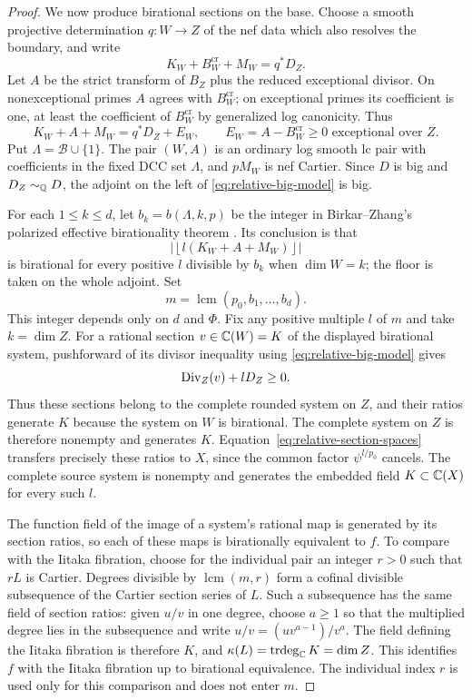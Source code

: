 \begin{proof}
We now produce birational sections on the base. Choose a smooth
projective determination $q:W\to Z$ of the nef data which also resolves
the boundary, and write
\[
 K_W+B_W^{\mathrm{cr}}+M_W=q^*D_Z.
\]
Let $A$ be the strict transform of $B_Z$ plus the reduced exceptional
divisor. On nonexceptional primes $A$ agrees with $B_W^{\mathrm{cr}}$;
on exceptional primes its coefficient is one, at least the coefficient
of $B_W^{\mathrm{cr}}$ by generalized log canonicity. Thus
\begin{equation}\label{eq:relative-big-model}
 K_W+A+M_W=q^*D_Z+E_W,
 \qquad E_W=A-B_W^{\mathrm{cr}}\geq0
       \text{ exceptional over }Z.
\end{equation}
Put $\Lambda=\mathcal B\cup\{1\}$. The pair $(W,A)$ is an ordinary
log smooth lc pair with coefficients in the fixed DCC set $\Lambda$,
and $pM_W$ is nef Cartier. Since $D$ is big and $D_Z\sim_\mathbb Q D$, the
adjoint on the left of \eqref{eq:relative-big-model} is big.

For each $1\leq k\leq d$, let $b_k=b(\Lambda,k,p)$ be the integer in
Birkar--Zhang's polarized effective birationality theorem
\cite[Theorem~1.3]{BirkarZhang2016}. Its conclusion is that
\[
 \left|\left\lfloor l(K_W+A+M_W)\right\rfloor\right|
\]
is birational for every positive $l$ divisible by $b_k$ when
$\dim W=k$; the floor is taken on the whole adjoint. Set
\[
 m=\operatorname{lcm}(p_0,b_1,\ldots,b_d).
\]
This integer depends only on $d$ and $\Phi$. Fix any positive multiple
$l$ of $m$ and take $k=\dim Z$. For a rational section
$v\in\mathbb C(W)=K$ of the displayed birational system, pushforward of its
divisor inequality using \eqref{eq:relative-big-model} gives
\[
 \operatorname{Div}_Z(v)+lD_Z\geq0.
\]
Thus these sections belong to the complete rounded system on $Z$,
and their ratios generate $K$ because the system on $W$ is birational.
The complete system on $Z$ is therefore nonempty and generates $K$.
Equation~\eqref{eq:relative-section-spaces} transfers precisely these
ratios to $X$, since the common factor $\psi^{l/p_0}$ cancels. The
complete source system is nonempty and generates the embedded field
$K\subset\mathbb C(X)$ for every such $l$.

The function field of the image of a system's rational map is generated
by its section ratios, so each of these maps is birationally equivalent
to $f$. To compare with the Iitaka fibration, choose for the individual
pair an integer $r>0$ such that $rL$ is Cartier. Degrees divisible by
$\operatorname{lcm}(m,r)$ form a cofinal divisible subsequence of the
Cartier section series of $L$. Such a subsequence has the same field
of section ratios: given $u/v$ in one degree, choose $a\geq1$ so that
the multiplied degree lies in the subsequence and write
$u/v=(uv^{a-1})/v^a$. The field defining the Iitaka
fibration is therefore $K$, and
$\kappa(L)=\operatorname{trdeg}_\mathbb C K=\dim Z$. This identifies $f$
with the Iitaka fibration up to birational equivalence. The individual
index $r$ is used only for this comparison and does not enter $m$.
\end{proof}
